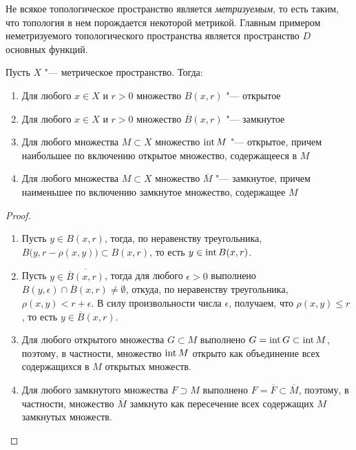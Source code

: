 \begin{note}
	Не всякое топологическое пространство является \textit{метризуемым}, то есть таким, что топология в нем порождается некоторой метрикой. Главным примером неметризуемого топологического пространства является пространство $D$ основных функций.
\end{note}

\begin{theorem}\label{thm1.3}
	Пусть $X$ "--- метрическое пространство. Тогда:
	\begin{enumerate}
		\item Для любого $x \in X$ и $r > 0$ множество $B(x, r)$ "--- открытое
		\item Для любого $x \in X$ и $r > 0$ множество $\overline B(x, r)$ "--- замкнутое
		\item Для любого множества $M \subset X$ множество $\operatorname{int} M$ "--- открытое, причем наибольшее по включению открытое множество, содержащееся в $M$
		\item Для любого множества $M \subset X$ множество $\overline M$ "--- замкнутое, причем наименьшее по включению замкнутое множество, содержащее $M$
	\end{enumerate}
\end{theorem}

\pagebreak

\begin{proof}~
	\begin{enumerate}
		\item Пусть $y \in B(x, r)$, тогда, по неравенству треугольника, $B\big(y, r - \rho(x, y)\big) \subset B(x, r)$, то есть $y \in \operatorname{int} B(x, r)$.
		
		\item Пусть $y \in \overline{\overline B(x, r)}$, тогда для любого $\epsilon > 0$ выполнено $B(y, \epsilon) \cap \overline B(x, r) \ne \emptyset$, откуда, по неравенству треугольника, $\rho(x, y) < r + \epsilon$. В силу произвольности числа $\epsilon$, получаем, что $\rho(x, y) \le r$, то есть $y \in \overline B(x, r)$.
		
		\item Для любого открытого множества $G \subset M$ выполнено $G = \operatorname{int} G \subset \operatorname{int} M$, поэтому, в частности, множество $\operatorname{int} M$ открыто как объединение всех содержащихся в $M$ открытых множеств.
  
		\item Для любого замкнутого множества $F \supset M$ выполнено $F = \overline F \subset \overline M$, поэтому, в частности, множество $\overline M$ замкнуто как пересечение всех содержащих $M$ замкнутых множеств.\qedhere
	\end{enumerate}
\end{proof}

